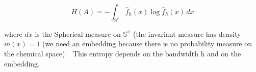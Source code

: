\[ H(A) = -\int_\mathbb{{S}^n}  \hat{f}_h(x)\log  \hat{f}_h(x) \,dx  \]



where $dx$ is the Spherical measure on $\mathbb{{S}^n}$ (the invariant measure has density $m(x)=1$ (we need an embedding because there is no probability measure on the chemical space). 
This entropy depends on the bandwidth h and on the embedding.
